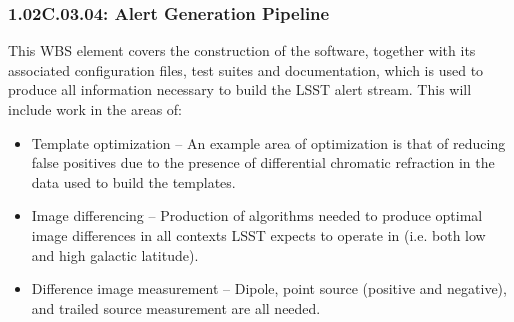 \subsubsection*{1.02C.03.04: Alert Generation Pipeline}

This WBS element covers the construction of the software,
together with its associated configuration files, test suites and
documentation, which is used to produce all information necessary to
build the LSST alert stream.  This will include work in the areas of:

\begin{itemize}

\item Template optimization -- An example area of optimization is that of reducing
false positives due to the presence of differential chromatic refraction in the
data used to build the templates.
\item Image differencing -- Production of algorithms needed to produce optimal
image differences in all contexts LSST expects to operate in (i.e. both low and high galactic
latitude).
\item Difference image measurement -- Dipole, point source (positive and negative), and trailed source
measurement are all needed.

\end{itemize}
